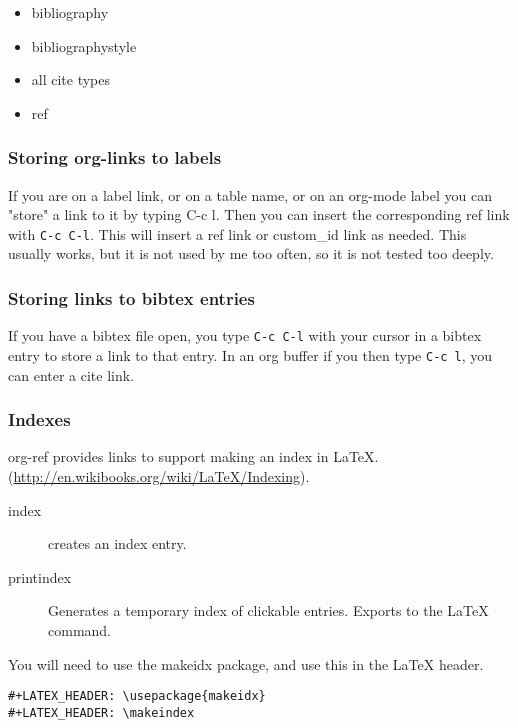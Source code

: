 \documentclass[11pt]{article}
\begin{document}
{\begin{itemize}
\item bibliography
\item bibliographystyle
\item all cite types
\item ref
\end{itemize}

\subsubsection{Storing org-links to labels}
\label{sec-3-3-2}

If you are on a label link, or on a table name, or on an org-mode label you can "store" a link to it by typing C-c l. Then you can insert the corresponding ref link with \verb~C-c C-l~. This will insert a ref link or custom\_id link as needed. This usually works, but it is not used by me too often, so it is not tested too deeply.

\subsubsection{Storing links to bibtex entries}
\label{sec-3-3-3}
If you have a bibtex file open, you type \verb~C-c C-l~ with your cursor in a bibtex entry to store a link to that entry. In an org buffer if you then type \verb~C-c l~, you can enter a cite link.

\subsubsection{Indexes}
\label{sec-3-3-4}

org-ref provides links to support making an index in \LaTeX{}. (\url{http://en.wikibooks.org/wiki/LaTeX/Indexing}).

\begin{description}
\item[{index}] creates an index entry.
\item[{printindex}] Generates a temporary index of clickable entries. Exports to the \LaTeX{} command.
\end{description}

You will need to use the makeidx package, and use this in the \LaTeX{} header.

\begin{verbatim}
#+LATEX_HEADER: \usepackage{makeidx}
#+LATEX_HEADER: \makeindex
\end{verbatim}

}
\end{document}

